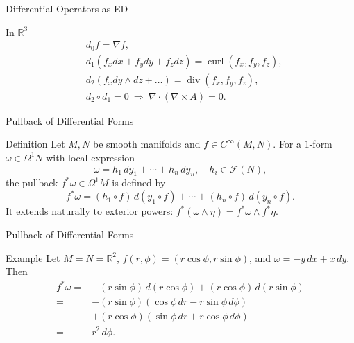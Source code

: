 \begin{frame}{Differential Operators as ED}
    \begin{block}{In \(\mathbb{R}^3\)}
\[
\begin{aligned}
&d_0f = \nabla f,\\[3pt]
&d_1(f_xdx+f_ydy+f_zdz)=\operatorname{curl}(f_x,f_y,f_z),\\[3pt]
&d_2(f_xdy\wedge dz+\dots)=\operatorname{div}(f_x,f_y,f_z),\\[3pt]
&d_2\circ d_1=0\ \Rightarrow\ \nabla\cdot(\nabla\times A)=0.
\end{aligned}
\]
\end{block}
\begin{center}
\end{center}
\end{frame}

\begin{frame}{Pullback of Differential Forms}
\begin{block}{Definition}
Let \(M,N\) be smooth manifolds and \(f\in C^\infty(M,N)\).
For a \(1\)-form \(\omega\in\Omega^1N\) with local expression
\[
\omega = h_1\,dy_1+\cdots+h_n\,dy_n,\quad h_i\in\mathcal{F}(N),
\]
the pullback \(f^*\omega\in\Omega^1M\) is defined by
\[
f^*\omega=(h_1\circ f)\,d(y_1\circ f)+\cdots+(h_n\circ f)\,d(y_n\circ f).
\]
It extends naturally to exterior powers: \(f^*(\omega\wedge\eta)=f^*\omega\wedge f^*\eta.\)
\end{block}
\end{frame}

\begin{frame}{Pullback of Differential Forms}
    \begin{block}{Example}
Let \(M=N=\mathbb{R}^2\), \(f(r,\phi)=(r\cos\phi,r\sin\phi)\), and \(\omega=-y\,dx+x\,dy\). Then
\[
\begin{aligned}
f^*\omega =& -(r\sin\phi)\,d(r\cos\phi)+(r\cos\phi)\,d(r\sin\phi)\\[3pt]
=& -(r\sin\phi)(\cos\phi\,dr-r\sin\phi\,d\phi)\\
&+(r\cos\phi)(\sin\phi\,dr+r\cos\phi\,d\phi)\\[3pt]
=&r^2\,d\phi.
\end{aligned}
\]
\end{block}
\end{frame}


